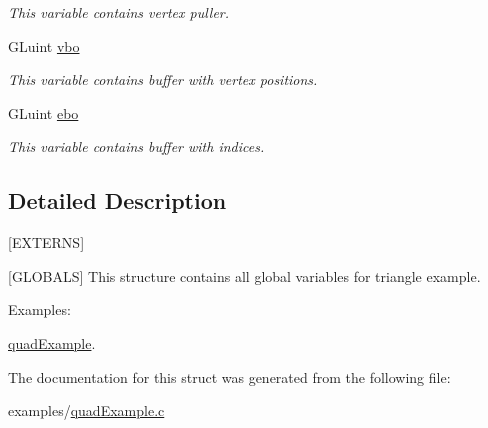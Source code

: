 \begin{DoxyCompactItemize}
\begin{DoxyCompactList}\small\item\em This variable contains vertex puller. \end{DoxyCompactList}\item 
\hypertarget{structQuadExampleVariables_a69515fd546272c117e14f784221f6412}{G\-Luint \hyperlink{structQuadExampleVariables_a69515fd546272c117e14f784221f6412}{vbo}}\label{structQuadExampleVariables_a69515fd546272c117e14f784221f6412}

\begin{DoxyCompactList}\small\item\em This variable contains buffer with vertex positions. \end{DoxyCompactList}\item 
\hypertarget{structQuadExampleVariables_a3b1abdb0f18593a0ebec8dd9a222164b}{G\-Luint \hyperlink{structQuadExampleVariables_a3b1abdb0f18593a0ebec8dd9a222164b}{ebo}}\label{structQuadExampleVariables_a3b1abdb0f18593a0ebec8dd9a222164b}

\begin{DoxyCompactList}\small\item\em This variable contains buffer with indices. \end{DoxyCompactList}\end{DoxyCompactItemize}


\subsection{Detailed Description}
\mbox{[}E\-X\-T\-E\-R\-N\-S\mbox{]} 

\mbox{[}G\-L\-O\-B\-A\-L\-S\mbox{]} This structure contains all global variables for triangle example. \begin{Desc}
\item[Examples\-: ]\par
\hyperlink{quadExample-example}{quad\-Example}.\end{Desc}


The documentation for this struct was generated from the following file\-:\begin{DoxyCompactItemize}
\item 
examples/\hyperlink{quadExample_8c}{quad\-Example.\-c}\end{DoxyCompactItemize}
